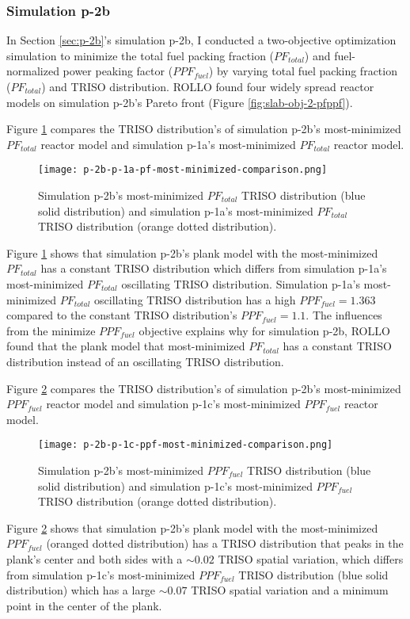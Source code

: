 \subsubsection{Simulation p-2b}
In Section \ref{sec:p-2b}'s simulation p-2b, I conducted a two-objective 
optimization simulation to minimize the total fuel packing fraction ($PF_{total}$) and 
fuel-normalized power peaking factor ($PPF_{fuel}$) by varying total fuel 
packing fraction ($PF_{total}$) and TRISO distribution. 
\gls{ROLLO} found four widely spread reactor models on simulation p-2b's Pareto 
front (Figure \ref{fig:slab-obj-2-pfppf}). 

Figure \ref{fig:p-2b-pf-triso-comparison} compares the TRISO distribution's of 
simulation p-2b's most-minimized $PF_{total}$ reactor model and simulation p-1a's 
most-minimized $PF_{total}$ reactor model. 
\begin{figure}[htbp!]
    \centering
    \texttt{[image: p-2b-p-1a-pf-most-minimized-comparison.png]} 
    \caption{Simulation p-2b's most-minimized $PF_{total}$ TRISO distribution (blue 
    solid distribution) and simulation p-1a's most-minimized $PF_{total}$ TRISO 
    distribution (orange dotted distribution).}
    \label{fig:p-2b-pf-triso-comparison}
\end{figure}
Figure \ref{fig:p-2b-pf-triso-comparison} shows that simulation p-2b's plank model 
with the most-minimized $PF_{total}$ has a constant TRISO distribution which differs 
from simulation p-1a's most-minimized $PF_{total}$ oscillating TRISO distribution. 
Simulation p-1a's most-minimized $PF_{total}$ oscillating TRISO distribution has a 
high $PPF_{fuel} = 1.363$ compared to the constant TRISO distribution's 
$PPF_{fuel} = 1.1$.
The influences from the minimize $PPF_{fuel}$ objective explains why for simulation p-2b, 
\gls{ROLLO} found that the plank model that most-minimized $PF_{total}$ has a 
constant TRISO distribution instead of an oscillating TRISO distribution.

Figure \ref{fig:p-2b-ppf-triso-comparison} compares the TRISO distribution's of 
simulation p-2b's most-minimized $PPF_{fuel}$ reactor model and simulation p-1c's 
most-minimized $PPF_{fuel}$ reactor model. 
\begin{figure}[htbp!]
    \centering
    \texttt{[image: p-2b-p-1c-ppf-most-minimized-comparison.png]} 
    \caption{Simulation p-2b's most-minimized $PPF_{fuel}$ TRISO distribution (blue 
    solid distribution) and simulation p-1c's most-minimized $PPF_{fuel}$ TRISO 
    distribution (orange dotted distribution).}
    \label{fig:p-2b-ppf-triso-comparison}
\end{figure}
Figure \ref{fig:p-2b-ppf-triso-comparison} shows that simulation p-2b's plank model 
with the most-minimized $PPF_{fuel}$ (oranged dotted distribution) has a TRISO 
distribution that peaks in the plank's center and both sides with a $\sim0.02$ 
TRISO spatial variation, which differs from simulation p-1c's most-minimized 
$PPF_{fuel}$ TRISO distribution (blue solid distribution) which has a 
large $\sim 0.07$ TRISO spatial variation and a minimum point in the center of the 
plank.

